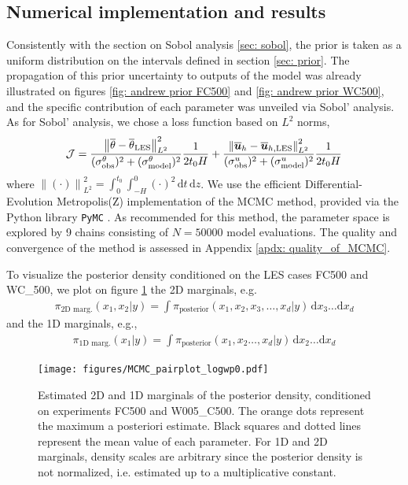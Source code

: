 \documentclass[draft]{agujournal2019}
\newcommand{\norm}[1]{\left\lVert #1 \right\rVert} %
\newcommand{\dd}{\mathrm{d}}
\begin{document}
\subsection{Numerical implementation and results}   
%
Consistently with the section on Sobol analysis \ref{sec: sobol}, the prior is taken as a uniform distribution on the intervals defined in section \ref{sec: prior}. The propagation of this prior uncertainty to outputs of the model was already illustrated on figures \ref{fig: andrew prior FC500} and \ref{fig: andrew prior WC500}, and the specific contribution of each parameter was unveiled via Sobol' analysis. As for Sobol' analysis, we chose a loss function based on $L^2$ norms, 
%
\begin{eqnarray*}
    \mathcal{J} = \frac{\norm{\overline{\theta}-\overline{\theta}_{\rm LES} }^2_{L^2} }{(\sigma^\theta_{\rm obs})^2 + (\sigma^\theta_{\rm model})^2} \frac{1}{2t_0 H}  + \frac{\norm{\overline{\bm u}_h-\overline{\bm u}_{h,{\rm LES} }}^2_{L^2} }{(\sigma^u_{\rm obs})^2 + (\sigma^u_{\rm model})^2} \frac{1}{2t_0 H} 
\end{eqnarray*}
%
where $\norm{(\cdot)}^2_{L^2} = \int_{0}^{t_0} \int_{-H}^{0} (\cdot)^2 \, \dd t \, \dd z $. We use the efficient Differential-Evolution Metropolis(Z) \cite{terbraak_differential_2008} implementation of the MCMC method, provided via the Python library \texttt{PyMC} \cite{abril-pla_pymc_2023}. As recommended for this method, the parameter space is explored by 9 chains consisting of $N=50000$ model evaluations. The quality and convergence of the method is assessed in Appendix \ref{apdx: quality_of_MCMC}.
%
\par To visualize the posterior density conditioned on the LES cases FC500 and WC\_500, we plot on figure \ref{fig: MCMC pairplot} the 2D marginals, e.g.
%
\begin{eqnarray*}
    \pi_{\text{2D marg.}} (x_1,x_2|y) = \int \pi_{\text{posterior}}(x_1,x_2,x_3,\ldots,x_d | y) \, \dd x_3 \ldots \dd x_d
\end{eqnarray*}
%
and the 1D marginals, e.g.,
%
\begin{eqnarray*}
    \pi_{\text{1D marg.}} (x_1|y) = \int \pi_{\text{posterior}}(x_1,x_2\ldots,x_d | y) \, \dd x_2 \ldots \dd x_d
\end{eqnarray*}
%
%
\begin{figure}
    \texttt{[image: figures/MCMC\_pairplot\_logwp0.pdf]}
    \caption{Estimated 2D and 1D marginals of the posterior density, conditioned on experiments FC500 and W005\_C500. The orange dots represent the maximum a posteriori estimate. Black squares and dotted lines represent the mean value of each parameter. For 1D and 2D marginals, density scales are arbitrary since the posterior density is not normalized, i.e. estimated up to a multiplicative constant.}
    \label{fig: MCMC pairplot}
\end{figure}
\end{document}
